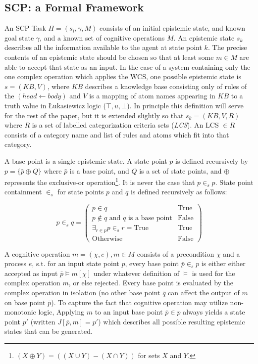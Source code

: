 \documentclass{article}
\begin{document}
\subsection{SCP: a Formal Framework}
An SCP Task $\Pi=(s_i, \gamma, M)$ consists of an initial epistemic state, and known goal state $\gamma$, and a known set of cognitive operations $M$. An epistemic state $s_k$ describes all the information available to the agent at state point $k$. The precise contents of an epistemic state should be chosen so that at least some $m \in M$ are able to accept that state as an input. In the case of a system containing only the one complex operation which applies the WCS, one possible epistemic state is $s=(KB,V)$, where $KB$ describes a knowledge base consisting only of rules of the $(head \leftarrow body)$ and $V$ is a mapping of atom names appearing in $KB$ to a truth value in \L ukasiewicz logic ($\top,u, \bot$). In principle this definition will serve for the rest of the paper, but it is extended slightly so that $s_k = (KB,V,R)$ where $R$ is a set of labelled categorization criteria sets (\textit{LCS}). An LCS $\in R$ consists of a category name and list of rules and atoms which fit into that category.

A base point is a single epistemic state. A state point $p$ is defined recursively by $p=\{\bar{p} \oplus Q \}$ where $\bar{p}$ is a base point, and $Q$ is a set of state points, and $\oplus$ represents the exclusive-or operation\footnote{$(X \oplus Y) = ((X \cup Y) - (X \cap Y))$ for sets $X$ and $Y$.}. It is never the case that $p \in_s p$. State point containment $\in_s$ for state points $p$ and $q$ is defined recursively as follows:

\[
p \in_s q = \begin{pmatrix} p \in q  & \textrm{True} \\ p \not\in q \textrm{ and } q \textrm{ is a base point} & \textrm{False}  \\  \exists_{r\in p}p \in_s r = \textrm{True} & \textrm{True}   \\ \textrm{Otherwise} & \textrm{False} \end{pmatrix}
\]


A cognitive operation $m = (\chi, e), m \in M$ consists of a precondition $\chi$ and a process $e$, s.t. for an input state point $p$, every base point $\bar{p} \in_s p$ is either either accepted as input $\bar{p} \models m[\chi]$ under whatever definition of $\models$ is used for the complex operation $m$, or else rejected. Every base point is evaluated by the complex operation in isolation (no other base point $\bar{q}$ can affect the output of $m$ on base point $\bar{p}$). To capture the fact that cognitive operation may utilize non-monotonic logic, Applying $m$ to an input base point $\bar{p}\in p$ always yields a state point $p'$ (written $J[\bar{p},m]=p'$) which describes all possible resulting epistemic states that can be generated. 
\end{document}

